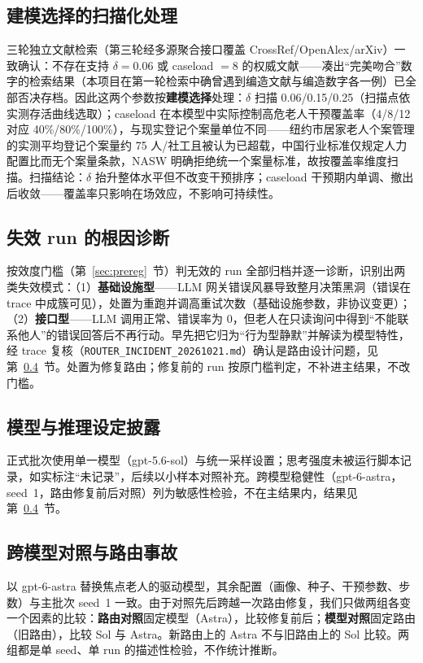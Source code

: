 \documentclass[10.5pt,twocolumn]{ctexart}
\begin{document}
\subsection{建模选择的扫描化处理}
三轮独立文献检索（第三轮经多源聚合接口覆盖 CrossRef/OpenAlex/arXiv）一致确认：不存在支持 $\delta=0.06$ 或 caseload $=8$ 的权威文献——凑出``完美吻合''数字的检索结果（本项目在第一轮检索中确曾遇到编造文献与编造数字各一例）已全部否决存档。因此这两个参数按\textbf{建模选择}处理：$\delta$ 扫描 0.06/0.15/0.25（扫描点依实测存活曲线选取）；caseload 在本模型中实际控制高危老人干预覆盖率（4/8/12 对应 40\%/80\%/100\%），与现实登记个案量单位不同——纽约市居家老人个案管理的实测平均登记个案量约 75 人/社工且被认为已超载\citep{pardasani2018caseload}，中国行业标准仅规定人力配置比而无个案量条款\citep{mzt064}，NASW 明确拒绝统一个案量标准\citep{nasw2013}，故按覆盖率维度扫描。扫描结论：$\delta$ 抬升整体水平但不改变干预排序；caseload 干预期内单调、撤出后收敛——覆盖率只影响在场效应，不影响可持续性。

\subsection{失效 run 的根因诊断}\label{sec:failure}
按效度门槛（第~\ref{sec:prereg}~节）判无效的 run 全部归档并逐一诊断，识别出两类失效模式：（1）\textbf{基础设施型}——LLM 网关错误风暴导致整月决策黑洞（错误在 trace 中成簇可见），处置为重跑并调高重试次数（基础设施参数，非协议变更）；（2）\textbf{接口型}——LLM 调用正常、错误率为 0，但老人在只读询问中得到``不能联系他人''的错误回答后不再行动。早先把它归为``行为型静默''并解读为模型特性，经 trace 复核（\texttt{ROUTER\_INCIDENT\_20261021.md}）确认是路由设计问题，见第~\ref{sec:robust}~节。处置为修复路由；修复前的 run 按原门槛判定，不补进主结果，不改门槛。

\subsection{模型与推理设定披露}
正式批次使用单一模型（gpt-5.6-sol）与统一采样设置；思考强度未被运行脚本记录，如实标注``未记录''，后续以小样本对照补充。跨模型稳健性（gpt-6-astra，seed~1，路由修复前后对照）列为敏感性检验，不在主结果内，结果见第~\ref{sec:robust}~节。

\subsection{跨模型对照与路由事故}\label{sec:robust}
以 gpt-6-astra 替换焦点老人的驱动模型，其余配置（画像、种子、干预参数、步数）与主批次 seed~1 一致。由于对照先后跨越一次路由修复，我们只做两组各变一个因素的比较：\textbf{路由对照}固定模型（Astra），比较修复前后；\textbf{模型对照}固定路由（旧路由），比较 Sol 与 Astra。新路由上的 Astra 不与旧路由上的 Sol 比较。两组都是单 seed、单 run 的描述性检验，不作统计推断。
\end{document}
